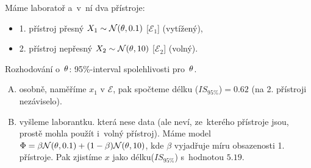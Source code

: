 \begin{example}
	Máme laboratoř a~v~ní dva přístroje:
	\begin{itemize}
		\item 1. přístroj přesný $X_1\sim\mathcal{N}(\theta,0.1)$ [$\mathcal{E}_1$] (vytížený),
		\item 2. přístroj nepřesný $X_2\sim\mathcal{N}(\theta,10)$ [$\mathcal{E}_2$] (volný).
	\end{itemize}
	Rozhodování o~$\theta$: 95\%-interval spolehlivosti pro~$\theta$.\begin{enumerate}[A)]
		\item osobně, naměříme $x_1$ v $\mathcal{E}$, pak spočteme délku ($IS_{95\%}$)$=0.62$ (na 2. přístroji nezáviselo).
		\item vyšleme laborantku. která nese data (ale neví, ze~kterého přístroje jsou, prostě mohla použít i~volný přístroj). Máme model $\Phi=\beta\mathcal{N}(\theta,0.1)+(1-\beta)\mathcal{N}(\theta,10)$, kde $\beta$ vyjadřuje míru obsazenosti 1. přístroje. Pak zjistíme $x$ jako délku($IS_{95\%}$) s~hodnotou $5.19$.
	\end{enumerate}
\end{example}
